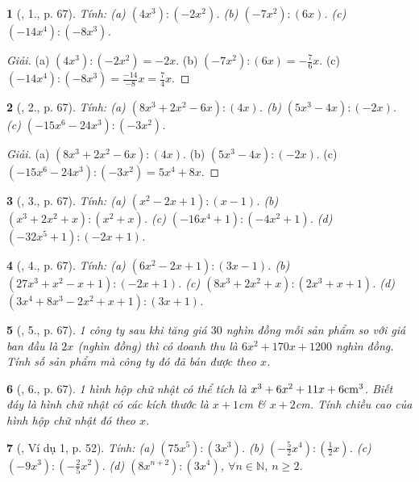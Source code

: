 \documentclass{article}
\newtheorem{baitoan}{}
\begin{document}
\begin{baitoan}[\cite{SGK_Toan_7_Canh_Dieu_tap_2}, 1., p. 67]
	Tính: (a) $(4x^3):(-2x^2)$. (b) $(-7x^2):(6x)$. (c) $(-14x^4):(-8x^3)$.
\end{baitoan}

\begin{proof}[Giải]
	(a) $(4x^3):(-2x^2) = -2x$. (b) $(-7x^2):(6x) = -\frac{7}{6}x$. (c) $(-14x^4):(-8x^3) = \frac{-14}{-8}x = \frac{7}{4}x$.
\end{proof}

\begin{baitoan}[\cite{SGK_Toan_7_Canh_Dieu_tap_2}, 2., p. 67]
	Tính: (a) $(8x^3 + 2x^2 - 6x):(4x)$. (b) $(5x^3 - 4x):(-2x)$. (c) $(-15x^6 - 24x^3):(-3x^2)$.
\end{baitoan}

\begin{proof}[Giải]
	(a) $(8x^3 + 2x^2 - 6x):(4x)$. (b) $(5x^3 - 4x):(-2x)$. (c) $(-15x^6 - 24x^3):(-3x^2) = 5x^4 + 8x$.
\end{proof}

\begin{baitoan}[\cite{SGK_Toan_7_Canh_Dieu_tap_2}, 3., p. 67]
	Tính: (a) $(x^2 - 2x + 1):(x - 1)$. (b) $(x^3 + 2x^2 + x):(x^2 + x)$. (c) $(-16x^4 + 1):(-4x^2 + 1)$. (d) $(-32x^5 + 1):(-2x + 1)$.
\end{baitoan}

\begin{baitoan}[\cite{SGK_Toan_7_Canh_Dieu_tap_2}, 4., p. 67]
	Tính: (a) $(6x^2 - 2x + 1):(3x - 1)$. (b) $(27x^3 + x^2 - x + 1):(-2x + 1)$. (c) $(8x^3 + 2x^2 + x):(2x^3 + x + 1)$. (d) $(3x^4 + 8x^3 - 2x^2 + x + 1):(3x + 1)$.
\end{baitoan}

\begin{baitoan}[\cite{SGK_Toan_7_Canh_Dieu_tap_2}, 5., p. 67]
	1 công ty sau khi tăng giá $30$ nghìn đồng mỗi sản phẩm so với giá ban đầu là $2x$ (nghìn đồng) thì có doanh thu là $6x^2 + 170x + 1200$ nghìn đồng. Tính số sản phẩm mà công ty đó đã bán được theo $x$.
\end{baitoan}

\begin{baitoan}[\cite{SGK_Toan_7_Canh_Dieu_tap_2}, 6., p. 67]
	1 hình hộp chữ nhật có thể tích là $x^3 + 6x^2 + 11x + 6{\rm cm}^3$. Biết đáy là hình chữ nhật có các kích thước là $x + 1$\emph{cm} \& $x + 2$\emph{cm}. Tính chiều cao của hình hộp chữ nhật đó theo $x$.
\end{baitoan}

\begin{baitoan}[\cite{SBT_Toan_7_Canh_Dieu_tap_2}, Ví dụ 1, p. 52]
	Tính: (a) $(75x^5):(3x^3)$. (b) $\left(-\frac{5}{2}x^4\right):\left(\frac{1}{2}x\right)$. (c) $(-9x^3):\left(-\frac{2}{5}x^2\right)$. (d) $(8x^{n+2}):(3x^4)$, $\forall n\in\mathbb{N}$, $n\ge2$.
\end{baitoan}
\end{document}
